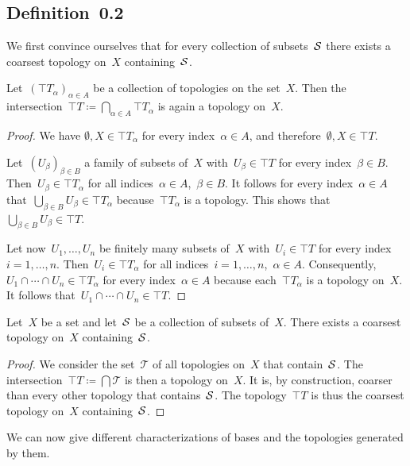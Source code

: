 \subsection{Definition~0.2}

We first convince ourselves that for every collection of subsets~$\mathcal{S}$ there exists a coarsest topology on~$X$ containing~$\mathcal{S}$.

\begin{proposition}
	\label{intersection of topologies}
	Let~$(\top{T}_α)_{α ∈ A}$ be a collection of topologies on the set~$X$.
	Then the intersection~$\top{T} ≔ ⋂_{α ∈ A} \top{T}_α$ is again a topology on~$X$.
\end{proposition}

\begin{proof}
	We have $∅, X ∈ \top{T}_α$ for every index~$α ∈ A$, and therefore~$∅, X ∈ \top{T}$.

	Let~$(U_β)_{β ∈ B}$ a family of subsets of~$X$ with~$U_β ∈ \top{T}$ for every index~$β ∈ B$.
	Then~$U_β ∈ \top{T}_α$ for all indices~$α ∈ A$,~$β ∈ B$.
	It follows for every index~$α ∈ A$ that~$⋃_{β ∈ B} U_β ∈ \top{T}_α$ because~$\top{T}_α$ is a topology.
	This shows that~$⋃_{β ∈ B} U_β ∈ \top{T}$.

	Let now~$U_1, \dotsc, U_n$ be finitely many subsets of~$X$ with~$U_i ∈ \top{T}$ for every index~$i = 1, \dotsc, n$.
	Then~$U_i ∈ \top{T}_α$ for all indices~$i = 1, \dotsc, n$,~$α ∈ A$.
	Consequently,~$U_1 ∩ \dotsb ∩ U_n ∈ \top{T}_α$ for every index~$α ∈ A$ because each~$\top{T}_α$ is a topology on~$X$.
	It follows that~$U_1 ∩ \dotsb ∩ U_n ∈ \top{T}$.
\end{proof}

\begin{proposition}
	Let~$X$ be a set and let~$\mathcal{S}$ be a collection of subsets of~$X$.
	There exists a coarsest topology on~$X$ containing~$\mathcal{S}$.
\end{proposition}

\begin{proof}
	We consider the set~$\mathscr{T}$ of all topologies on~$X$ that contain~$\mathcal{S}$.
	The intersection~$\top{T} ≔ ⋂ \mathscr{T}$ is then a topology on~$X$.
	It is, by construction, coarser than every other topology that contains~$\mathcal{S}$.
	The topology~$\top{T}$ is thus the coarsest topology on~$X$ containing~$\mathcal{S}$.
\end{proof}

We can now give different characterizations of bases and the topologies generated by them.


